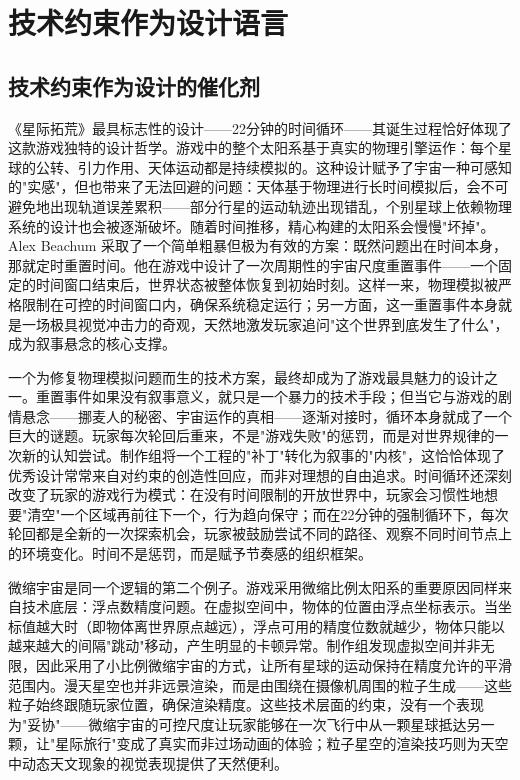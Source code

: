 \section{技术约束作为设计语言}

\subsection{技术约束作为设计的催化剂}

《星际拓荒》最具标志性的设计——22分钟的时间循环——其诞生过程恰好体现了这款游戏独特的设计哲学。游戏中的整个太阳系基于真实的物理引擎运作：每个星球的公转、引力作用、天体运动都是持续模拟的。这种设计赋予了宇宙一种可感知的"实感"，但也带来了无法回避的问题：天体基于物理进行长时间模拟后，会不可避免地出现轨道误差累积——部分行星的运动轨迹出现错乱，个别星球上依赖物理系统的设计也会被逐渐破坏。随着时间推移，精心构建的太阳系会慢慢"坏掉"。Alex Beachum 采取了一个简单粗暴但极为有效的方案：既然问题出在时间本身，那就定时重置时间。他在游戏中设计了一次周期性的宇宙尺度重置事件——一个固定的时间窗口结束后，世界状态被整体恢复到初始时刻。这样一来，物理模拟被严格限制在可控的时间窗口内，确保系统稳定运行；另一方面，这一重置事件本身就是一场极具视觉冲击力的奇观，天然地激发玩家追问"这个世界到底发生了什么"，成为叙事悬念的核心支撑。

一个为修复物理模拟问题而生的技术方案，最终却成为了游戏最具魅力的设计之一。重置事件如果没有叙事意义，就只是一个暴力的技术手段；但当它与游戏的剧情悬念——挪麦人的秘密、宇宙运作的真相——逐渐对接时，循环本身就成了一个巨大的谜题。玩家每次轮回后重来，不是"游戏失败"的惩罚，而是对世界规律的一次新的认知尝试。制作组将一个工程的"补丁"转化为叙事的"内核"，这恰恰体现了优秀设计常常来自对约束的创造性回应，而非对理想的自由追求。时间循环还深刻改变了玩家的游戏行为模式：在没有时间限制的开放世界中，玩家会习惯性地想要"清空"一个区域再前往下一个，行为趋向保守；而在22分钟的强制循环下，每次轮回都是全新的一次探索机会，玩家被鼓励尝试不同的路径、观察不同时间节点上的环境变化。时间不是惩罚，而是赋予节奏感的组织框架。

微缩宇宙是同一个逻辑的第二个例子。游戏采用微缩比例太阳系的重要原因同样来自技术底层：浮点数精度问题。在虚拟空间中，物体的位置由浮点坐标表示。当坐标值越大时（即物体离世界原点越远），浮点可用的精度位数就越少，物体只能以越来越大的间隔"跳动"移动，产生明显的卡顿异常。制作组发现虚拟空间并非无限，因此采用了小比例微缩宇宙的方式，让所有星球的运动保持在精度允许的平滑范围内。漫天星空也并非远景渲染，而是由围绕在摄像机周围的粒子生成——这些粒子始终跟随玩家位置，确保渲染精度。这些技术层面的约束，没有一个表现为"妥协"——微缩宇宙的可控尺度让玩家能够在一次飞行中从一颗星球抵达另一颗，让"星际旅行"变成了真实而非过场动画的体验；粒子星空的渲染技巧则为天空中动态天文现象的视觉表现提供了天然便利。

